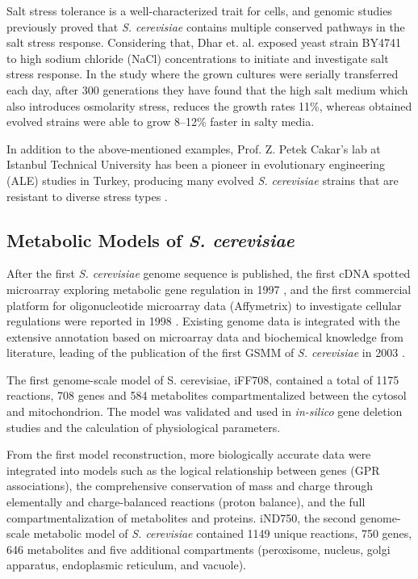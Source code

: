 Salt stress tolerance is a well-characterized trait for cells, and genomic studies previously proved that \emph{S. cerevisiae} contains multiple conserved pathways in the salt stress response\cite{gaxiola1992novel}. Considering that, Dhar et. al. exposed yeast strain BY4741 to high sodium chloride (NaCl) concentrations to initiate and investigate salt stress response. In the study where the grown cultures were serially transferred each day, after 300 generations they have found that the high salt medium which also introduces osmolarity stress, reduces the growth rates 11\%, whereas obtained evolved strains were able to grow 8–12\% faster in salty media.

In addition to the above-mentioned examples, Prof. Z. Petek Cakar's lab at Istanbul Technical University has been a pioneer in evolutionary engineering (ALE) studies in Turkey, producing many evolved \emph{S. cerevisiae} strains that are resistant to diverse stress types \cite{turanli2017vivo, surmeli2019evolutionary, hacisalihouglu2019genomic, balaban2020evolutionary, kuccukgoze2013evolutionary, holyavkin2013evrimsel, terziouglu2020genomic}.

\subsection{Metabolic Models of \emph{S. cerevisiae}}
After the first \emph{S. cerevisiae} genome sequence is published, the first cDNA spotted microarray exploring metabolic gene regulation in 1997 \cite{derisi1997exploring}, and the first commercial platform for oligonucleotide microarray data (Affymetrix) to investigate cellular regulations were reported in 1998 \cite{cho1998parallel}. Existing genome data is integrated with the extensive annotation based on microarray data and biochemical knowledge from literature, leading of the publication of the first GSMM of \emph{S. cerevisiae} in 2003 \cite{forster2003genome}.

The first genome-scale model of S. cerevisiae, iFF708, contained a total of 1175 reactions, 708 genes and 584 metabolites compartmentalized between the cytosol and mitochondrion. The model was validated and used in \emph{in-silico} gene deletion studies\cite{forster2003large} and the calculation of physiological parameters\cite{famili2003saccharomyces}.

From the first model reconstruction, more biologically accurate data were integrated into models such as the logical relationship between genes (GPR associations), the comprehensive conservation of mass and charge through elementally and charge-balanced reactions (proton balance), and the full compartmentalization of metabolites and proteins. iND750, the second genome-scale metabolic model of \emph{S. cerevisiae} contained 1149 unique reactions, 750	genes, 646 metabolites and five additional compartments (peroxisome, nucleus, golgi apparatus, endoplasmic reticulum, and vacuole)\cite{duarte2004reconstruction}.

